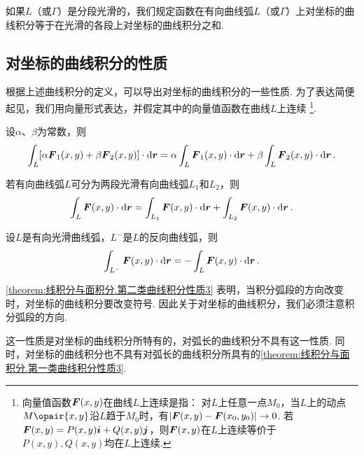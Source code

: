 如果\(L\)（或\(\Gamma\)）是分段光滑的，我们规定函数在有向曲线弧\(L\)（或\(\Gamma\)）上对坐标的曲线积分等于在光滑的各段上对坐标的曲线积分之和.

\subsection{对坐标的曲线积分的性质}
根据上述曲线积分的定义，可以导出对坐标的曲线积分的一些性质.
为了表达简便起见，我们用向量形式表达，并假定其中的向量值函数在曲线\(L\)上连续%
\footnote{向量值函数\(\boldsymbol{F}(x,y)\)在曲线\(L\)上连续是指：%
对\(L\)上任意一点\(M_0\)，当\(L\)上的动点\(M\opair{x,y}\)沿\(L\)趋于\(M_0\)时，有\(\abs{\boldsymbol{F}(x,y)-\boldsymbol{F}(x_0,y_0)}\to0\).%
若\(\boldsymbol{F}(x,y)=P(x,y)\boldsymbol{i}+Q(x,y)\boldsymbol{j}\)，则\(\boldsymbol{F}(x,y)\)在\(L\)上连续等价于\(P(x,y),Q(x,y)\)均在\(L\)上连续.}.

\begin{property}\label{theorem:线积分与面积分.第二类曲线积分性质1}
设\(\alpha\)、\(\beta\)为常数，则\[
\int_L [\alpha \boldsymbol{F}_1(x,y) + \beta \boldsymbol{F}_2(x,y)] \cdot \dd{\boldsymbol{r}}
= \alpha \int_L \boldsymbol{F}_1(x,y) \cdot \dd{\boldsymbol{r}}
+ \beta \int_L \boldsymbol{F}_2(x,y) \cdot \dd{\boldsymbol{r}}.
\]
\end{property}

\begin{property}\label{theorem:线积分与面积分.第二类曲线积分性质2}
若有向曲线弧\(L\)可分为两段光滑有向曲线弧\(L_1\)和\(L_2\)，则\[
\int_L \boldsymbol{F}(x,y) \cdot \dd{\boldsymbol{r}}
= \int_{L_1} \boldsymbol{F}(x,y) \cdot \dd{\boldsymbol{r}}
+ \int_{L_2} \boldsymbol{F}(x,y) \cdot \dd{\boldsymbol{r}}.
\]
\end{property}

\begin{property}\label{theorem:线积分与面积分.第二类曲线积分性质3}
设\(L\)是有向光滑曲线弧，\(L^-\)是\(L\)的反向曲线弧，则\[
\int_{L^-} \boldsymbol{F}(x,y) \cdot \dd{\boldsymbol{r}}
= - \int_L \boldsymbol{F}(x,y) \cdot \dd{\boldsymbol{r}}.
\]
\end{property}
\cref{theorem:线积分与面积分.第二类曲线积分性质3} 表明，当积分弧段的方向改变时，对坐标的曲线积分要改变符号.
因此关于对坐标的曲线积分，我们必须注意积分弧段的方向.

这一性质是对坐标的曲线积分所特有的，对弧长的曲线积分不具有这一性质.
同时，对坐标的曲线积分也不具有对弧长的曲线积分所具有的\cref{theorem:线积分与面积分.第一类曲线积分性质3}.

